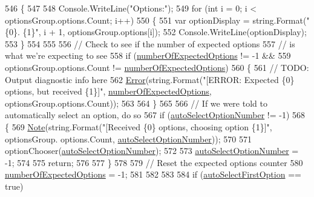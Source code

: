 \begin{DoxyCode}
546             \{
547 
548                 Console.WriteLine(\textcolor{stringliteral}{"Options:"});
549                 \textcolor{keywordflow}{for} (\textcolor{keywordtype}{int} i = 0; i < optionsGroup.options.Count; i++)
550                 \{
551                     var optionDisplay = string.Format(\textcolor{stringliteral}{"\{0\}. \{1\}"}, i + 1, optionsGroup.options[i]);
552                     Console.WriteLine(optionDisplay);
553                 \}
554 
555 
556                 \textcolor{comment}{// Check to see if the number of expected options}
557                 \textcolor{comment}{// is what we're expecting to see}
558                 \textcolor{keywordflow}{if} (\hyperlink{a00036_a2e17937195ecd64d5d867d958c45d2c3}{numberOfExpectedOptions} != -1 &&
559                     optionsGroup.options.Count != \hyperlink{a00036_a2e17937195ecd64d5d867d958c45d2c3}{numberOfExpectedOptions})
560                 \{
561                     \textcolor{comment}{// TODO: Output diagnostic info here}
562                     \hyperlink{a00171_a2f63f9f5b7634cb50ee75ff2eb18b137}{Error}(\textcolor{keywordtype}{string}.Format(\textcolor{stringliteral}{"[ERROR: Expected \{0\} options, but received \{1\}]"}, 
      \hyperlink{a00036_a2e17937195ecd64d5d867d958c45d2c3}{numberOfExpectedOptions}, optionsGroup.options.Count));
563 
564                 \}
565 
566                 \textcolor{comment}{// If we were told to automatically select an option, do so}
567                 \textcolor{keywordflow}{if} (\hyperlink{a00036_a34886671e91a1bf3fc225eeb67baced1}{autoSelectOptionNumber} != -1)
568                 \{
569                     \hyperlink{a00171_a939cc9e943c574b36c6af93e9c772702}{Note}(\textcolor{keywordtype}{string}.Format(\textcolor{stringliteral}{"[Received \{0\} options, choosing option \{1\}]"}, optionsGroup.
      options.Count, \hyperlink{a00036_a34886671e91a1bf3fc225eeb67baced1}{autoSelectOptionNumber}));
570 
571                     optionChooser(\hyperlink{a00036_a34886671e91a1bf3fc225eeb67baced1}{autoSelectOptionNumber});
572 
573                     \hyperlink{a00036_a34886671e91a1bf3fc225eeb67baced1}{autoSelectOptionNumber} = -1;
574 
575                     \textcolor{keywordflow}{return};
576 
577                 \}
578 
579                 \textcolor{comment}{// Reset the expected options counter}
580                 \hyperlink{a00036_a2e17937195ecd64d5d867d958c45d2c3}{numberOfExpectedOptions} = -1;
581 
582 
583 
584                 \textcolor{keywordflow}{if} (\hyperlink{a00036_a09a552ee9ff58cb3c995f8ecba1592b6}{autoSelectFirstOption} == \textcolor{keyword}{true})

\end{DoxyCode}

